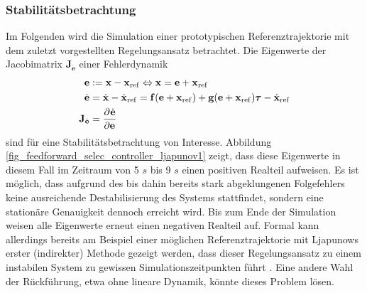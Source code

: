 \subsubsection{Stabilitätsbetrachtung}
Im Folgenden wird die Simulation einer prototypischen Referenztrajektorie mit dem zuletzt vorgestellten Regelungsansatz betrachtet. Die Eigenwerte der Jacobimatrix $\mathbf{J}_{\dot{\mathbf{e}}}$ einer Fehlerdynamik
\begin{align}
	\mathbf{e} &:= \mathbf{x} - \mathbf{x}_{\mathrm{ref}} \Leftrightarrow \mathbf{x} = \mathbf{e} + \mathbf{x}_{\mathrm{ref}} \\
	\dot{\mathbf{e}} &= \dot{\mathbf{x}} - \dot{\mathbf{x}}_{\mathrm{ref}} = \mathbf{f}(\mathbf{e} + \mathbf{x}_{\mathrm{ref}}) + \mathbf{g}(\mathbf{e} + \mathbf{x}_{\mathrm{ref}}) \boldsymbol{\tau} - \dot{\mathbf{x}}_{\mathrm{ref}} \\
	\mathbf{J}_{\dot{\mathbf{e}}} &= \frac{\partial^{}\dot{\mathbf{e}}}{\partial{\mathbf{e}}^{}}
\end{align}
sind für eine Stabilitätsbetrachtung von Interesse. Abbildung \ref{fig_feedforward_selec_controller_ljapunov1} zeigt, dass diese Eigenwerte in diesem Fall im Zeitraum von 5 $\si{s}$ bis 9 $\si{s}$ einen positiven Realteil aufweisen. Es ist möglich, dass aufgrund des bis dahin bereits stark abgeklungenen Folgefehlers keine ausreichende Destabilisierung des Systems stattfindet, sondern eine stationäre Genauigkeit dennoch erreicht wird. Bis zum Ende der Simulation weisen alle Eigenwerte erneut einen negativen Realteil auf. Formal kann allerdings bereits am Beispiel einer möglichen Referenztrajektorie mit Ljapunows erster (indirekter) Methode gezeigt werden, dass dieser Regelungsansatz zu einem instabilen System zu gewissen Simulationszeitpunkten führt \cite[Vorlesung 4]{NLRT_Winkler2020}. Eine andere Wahl der Rückführung, etwa ohne lineare Dynamik, könnte dieses Problem lösen.

